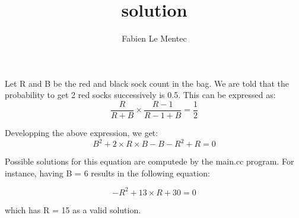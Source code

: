 \documentclass[a4paper,11pt]{report}
\begin{document}
\title{solution}
\author{Fabien Le Mentec}

\maketitle

Let R and B be the red and black sock count in the bag.
We are told that the probability to get 2 red socks successively is 0.5.
This can be expressed as:
\[
\frac{R}{R+B} \times \frac{R-1}{R-1+B} = \frac{1}{2}
\]

Developping the above expression, we get:
\[
B^2 + 2 \times R \times B - B - R^2 + R = 0
\]

Possible solutions for this equation are computede by the main.cc program.
For instance, having B = 6 results in the following equation:

\[ - R^2 + 13 \times R + 30 = 0 \]

which has R = 15 as a valid solution.
\end{document}
